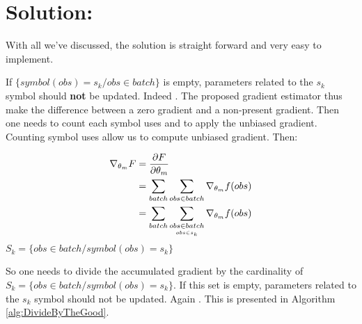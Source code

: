 \section{Solution: \tecname}



With all we've discussed, the solution is straight forward and very easy to implement.





If $\{symbol(obs) = s_k / obs \in batch\}$ is empty, parameters related to the $s_k$ symbol should \textbf{not} be updated. Indeed \mainContrib. The proposed gradient estimator thus make the difference between a zero gradient and a non-present gradient. Then one needs to count each symbol uses and to apply the unbiased gradient. Counting symbol uses allow us to compute unbiased gradient. Then:


\begin{align*} 
\nabla_{\theta_{m}} F &= \frac{\partial F}{\partial \theta_{m}}\\
 &= \sum_{batch} \sum_{obs \in batch} \nabla_{\theta_{m}} f(obs) \\ 
 &= \sum_{batch} \sum_{\underset{obs \in s_k}{obs \in batch}} \nabla_{\theta_{m}} f(obs)
\end{align*}
$S_k = \{obs \in batch / symbol(obs) = s_k \} $

So one needs  to divide the accumulated gradient by the cardinality of $S_k = \{obs \in batch / symbol(obs) = s_k \} $. If this set is empty, parameters related to the $s_k$ symbol should not be updated. Again \mainContrib. This is presented in Algorithm \ref{alg:DivideByTheGood}.



